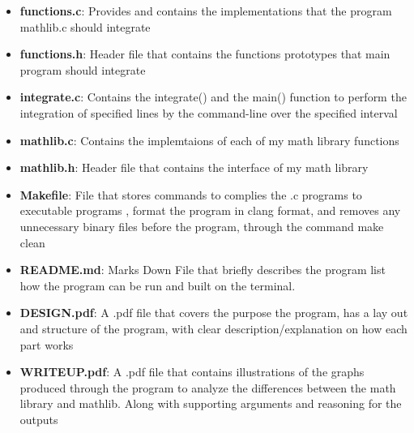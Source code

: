 \documentclass[11pt]{article} %
\begin{document}
\begin{itemize}
  \item \textbf{functions.c}: Provides and contains the implementations that the program mathlib.c should integrate
  \item \textbf{functions.h}: Header file that contains the functions prototypes that main program should integrate
  \item \textbf{integrate.c}: Contains the integrate() and the main() function to perform the integration of specified lines by the command-line over the specified interval
  \item \textbf{mathlib.c}:  Contains the implemtaions of each of my math library functions
  \item \textbf{mathlib.h}: Header file that contains the interface of my math library 
  \item \textbf{Makefile}: File that stores commands to complies the .c programs to executable programs , format the program in clang format, and removes any unnecessary binary files before the program, through the command make clean
  \item \textbf{README.md}: Marks Down File that briefly describes the program list how the program can be run and built on the terminal.
  \item \textbf{DESIGN.pdf}: A .pdf file that covers the purpose the program, has a lay out and structure of the program, with clear description/explanation on how each part works
  \item \textbf{WRITEUP.pdf}: A .pdf file that contains illustrations of the graphs produced through the program to analyze the differences between the math library and mathlib. Along with supporting arguments and reasoning for the outputs  
\end{itemize}

\pagebreak
\end{document}
